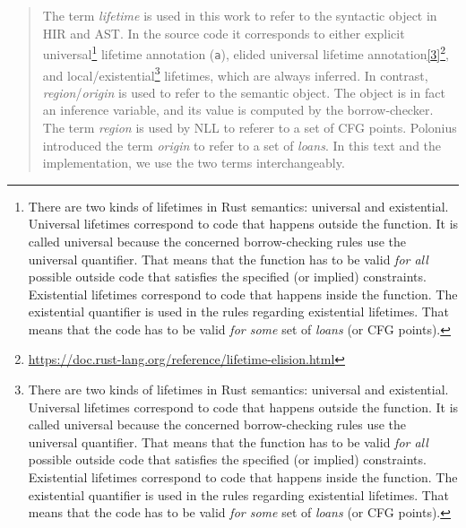 \documentclass[
  11pt,
  twoside,symmetric]{report}
\DeclareRobustCommand{\href}[2]{#2\footnote{\url{#1}}}
\begin{document}
\begin{quote}
The term \emph{lifetime} is used in this work to refer to the syntactic
object in HIR and AST. In the source code it corresponds to either
explicit universal\footnote{There are two kinds of lifetimes in Rust
  semantics: universal and existential. Universal lifetimes correspond
  to code that happens outside the function. It is called universal
  because the concerned borrow-checking rules use the universal
  quantifier. That means that the function has to be valid \emph{for
  all} possible outside code that satisfies the specified (or implied)
  constraints. Existential lifetimes correspond to code that happens
  inside the function. The existential quantifier is used in the rules
  regarding existential lifetimes. That means that the code has to be
  valid \emph{for some} set of \emph{loans} (or CFG points).} lifetime
annotation (\texttt{\textquotesingle{}a}), elided universal lifetime
annotation\href{https://doc.rust-lang.org/reference/lifetime-elision.html}{\protect\hyperlink{ref-reference}{{[}3{]}}},
and local/existential\footnote{There are two kinds of lifetimes in Rust
  semantics: universal and existential. Universal lifetimes correspond
  to code that happens outside the function. It is called universal
  because the concerned borrow-checking rules use the universal
  quantifier. That means that the function has to be valid \emph{for
  all} possible outside code that satisfies the specified (or implied)
  constraints. Existential lifetimes correspond to code that happens
  inside the function. The existential quantifier is used in the rules
  regarding existential lifetimes. That means that the code has to be
  valid \emph{for some} set of \emph{loans} (or CFG points).} lifetimes,
which are always inferred. In contrast, \emph{region}/\emph{origin} is
used to refer to the semantic object. The object is in fact an inference
variable, and its value is computed by the borrow-checker. The term
\emph{region} is used by NLL to referer to a set of CFG points. Polonius
introduced the term \emph{origin} to refer to a set of \emph{loans}. In
this text and the implementation, we use the two terms interchangeably.
\end{quote}
\end{document}

